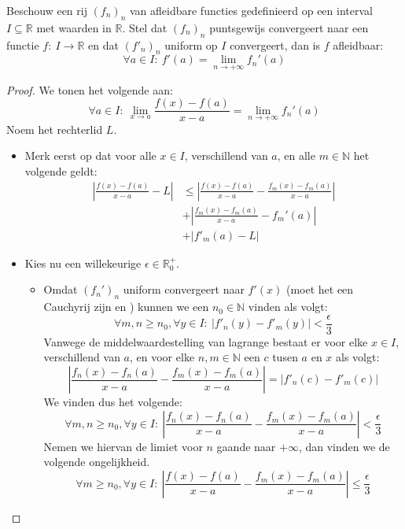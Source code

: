 \documentclass[main.tex]{subfiles}
\begin{document}
\begin{bst}
  Beschouw een rij $(f_{n})_{n}$ van afleidbare functies gedefinieerd op een interval $I \subseteq \mathbb{R}$ met waarden in $\mathbb{R}$.
  Stel dat $(f_{n})_{n}$ puntsgewijs convergeert naar een functie $f:\ I \rightarrow \mathbb{R}$ en dat $(f'_{n})_{n}$ uniform op $I$ convergeert, dan is $f$ afleidbaar:
  \[ \forall a\in I:\ f'(a) = \lim_{n\rightarrow +\infty}f_{n}'(a) \]

  \begin{proof}
    We tonen het volgende aan:
    \[ \forall a\in I:\ \lim_{x\rightarrow a}\frac{f(x)-f(a)}{x-a} = \lim_{n\rightarrow +\infty}f_{n}'(a) \]
    Noem het rechterlid $L$.
    \begin{itemize}
    \item Merk eerst op dat voor alle $x\in I$, verschillend van $a$, en alle $m\in \mathbb{N}$ het volgende geldt:
      \[
      \begin{array}{rl}
        \left| \frac{f(x)-f(a)}{x-a} - L \right| 
        &\le \left| \frac{f(x)-f(a)}{x-a} - \frac{f_{m}(x)-f_{m}(a)}{x-a} \right|\\
        &+ \left| \frac{f_{m}(x)-f_{m}(a)}{x-a} - f_{m}'(a) \right|\\
        &+ \left| f'_{m}(a) - L \right|
      \end{array}
      \]
    \item Kies nu een willekeurige $\epsilon \in \mathbb{R}_{0}^{+}$.
      \begin{itemize}
      \item 
        Omdat $(f_{n}')_{n}$ uniform convergeert naar $f'(x)$ (moet het een Cauchyrij zijn \waarom en ) kunnen we een $n_{0}\in \mathbb{N}$ vinden als volgt:
        \[ \forall m,n \ge n_{0},\forall y\in I:\ |f'_{n}(y)-f'_{m}(y)| < \frac{\epsilon}{3} \]
        Vanwege de middelwaardestelling van lagrange bestaat er voor elke $x\in I$, verschillend van $a$, en voor elke $n,m\in \mathbb{N}$ een $c$ tusen $a$ en $x$ als volgt:
        \[ \left| \frac{f_{n}(x)-f_{n}(a)}{x-a} - \frac{f_{m}(x)-f_{m}(a)}{x-a}\right| = \left| f'_{n}(c) -f'_{m}(c) \right| \]
        We vinden dus het volgende:
        \[ \forall m,n \ge n_{0},\forall y\in I:\ \left| \frac{f_{n}(x)-f_{n}(a)}{x-a} - \frac{f_{m}(x)-f_{m}(a)}{x-a}\right| < \frac{\epsilon}{3} \]
        Nemen we hiervan de limiet voor $n$ gaande naar $+\infty$, dan vinden we de volgende ongelijkheid.
        \[ \forall m \ge n_{0},\forall y\in I:\ \left| \frac{f(x)-f(a)}{x-a} - \frac{f_{m}(x)-f_{m}(a)}{x-a}\right| \le \frac{\epsilon}{3} \]

\end{itemize}
\end{itemize}
\end{proof}
\end{bst}
\end{document}
